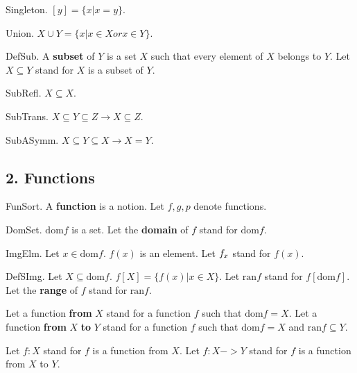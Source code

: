 \begin{definition} Singleton.
$[y] = \{ x | x = y \}$.
\end{definition}

\begin{definition} Union.
$X \cup Y = \{ x | x \in X or x \in Y \}$.
\end{definition}

\begin{definition} DefSub.  
A {\bf subset} of $Y$ is a set $X$ such that
every element of $X$ belongs to $Y$.
Let $X \subseteq Y$ stand for $X$ is a subset of $Y$.
\end{definition}

\begin{lemma} SubRefl.
$X \subseteq X$.
\end{lemma}

\begin{lemma} SubTrans.
$X \subseteq Y \subseteq Z  \rightarrow  X \subseteq Z$.
\end{lemma}

\begin{axiom} SubASymm.
$X \subseteq Y \subseteq X  \rightarrow  X = Y$.
\end{axiom}


\subsection{2. Functions}


\begin{signature} FunSort.
A {\bf function} is a notion.
Let $f,g,p$ denote functions.
\end{signature}

\begin{signature} DomSet.
$\text{dom} f$ is a set.
Let the {\bf domain} of $f$ stand for $\text{dom} f$.
\end{signature}

\begin{signature} ImgElm.
Let $x \in \text{dom} f$. $f(x)$ is an element.
Let ${f}_{x}$ stand for $f(x)$.
\end{signature}

\begin{definition} DefSImg. 
Let $X \subseteq \text{dom} f$. $f[X] = \{ f(x) | x \in X \}$.
Let $\text{ran} f$ stand for $f[\text{dom} f]$.
Let the {\bf range} of $f$ stand for $\text{ran} f$.

Let a function {\bf from} $X$ stand for a function $f$
such that $\text{dom} f = X$.
Let a function {\bf from} $X$ {\bf to} $Y$ stand 
for a function $f$ such that $\text{dom} f = X$
and $\text{ran} f \subseteq Y$.

Let $f : X$ stand for $f$ is a function from $X$.
Let $f : X -> Y$ stand for $f$ is a function from $X$ to $Y$.
\end{definition}

